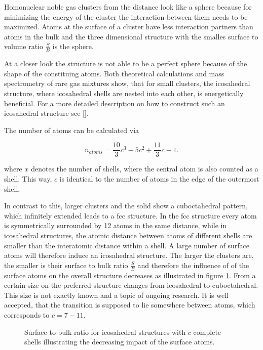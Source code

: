 Homonuclear noble gas clusters from the distance look like a sphere
because for minimizing
the energy of the cluster the interaction between them needs to be
maximized. Atoms at the surface of a cluster have less interaction
partners than atoms in the bulk and the three dimensional structure
with the smalles surface to volume
ratio $\frac{S}{B}$ is the sphere. 

At a closer look the structure is not able to be a perfect sphere
because of the shape of the constituing atoms. Both theoretical
calculations and mass spectrometry of rare gas mixtures show, that
for small clusters, the icosahedral structure, where icosahedral
shells are nested into each other, is energetically beneficial.
For a more detailed description on how to construct such an icosahedral
structure see \ref{}.

The number of atoms can be calculated via

\begin{equation}
  n_{atoms} = \frac{10}{3} c^3 - 5 c^2 + \frac{11}{3} c -1 .
\end{equation}

where $x$ denotes the number of shells, where the central atom is
also counted as a shell. \cite{Martin96} This way, $c$ is
identical to the number of atoms
in the edge of the outermost shell.


In contrast to this, larger clusters and the solid show a cuboctahedral
pattern, which infinitely extended leads to a \ac{fcc} structure.
In the \ac{fcc} structure every atom is symmetrically surrounded
by 12 atoms in the same distance, while in icosahedral structures, the
atomic distance between atoms of different shells are smaller than the
interatomic distance within a shell. A large number of surface atoms
will therefore induce an icosahedral structure.
The larger the clusters are, the smaller is their surface to bulk
ratio $\frac{S}{B}$ and therefore the influence of of the surface
atoms on the overall structure decreases as illustrated in
figure \ref{figure:surface_to_bulk}. From a certain size on the
preferred structure changes from icosahedral to cuboctahedral. This size
is not exactly known and a topic of ongoing research. It is well accepted,
that the transition is supposed to lie somewhere between \unit[800--3000]{atoms},
which corresponds to $c = 7 - 11$.

\begin{figure}[h]
 \centering
 
 \caption{Surface to bulk ratio for icosahedral structures with $c$ complete
          shells illustrating the decreasing impact of the surface atoms.}
 \label{figure:surface_to_bulk}
\end{figure}

